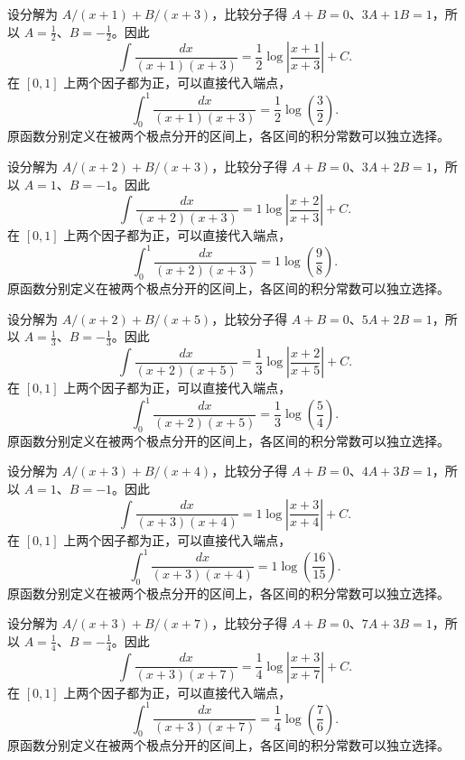 \documentclass[12pt,fontset=fandol]{ctexart}
\begin{document}
\begin{solve}\label{ans:c13q14}
设分解为 $A/(x+1)+B/(x+3)$，比较分子得 $A+B=0$、$3A+1B=1$，所以 $A=\frac{1}{2}$、$B=-\frac{1}{2}$。因此
\[
\int\frac{dx}{(x+1)(x+3)}=\frac{1}{2}\log\left|\frac{x+1}{x+3}\right|+C.
\]
在 $[0,1]$ 上两个因子都为正，可以直接代入端点，
\[
\int_0^1\frac{dx}{(x+1)(x+3)}=\frac{1}{2}\log\left(\frac{3}{2}\right).
\]
原函数分别定义在被两个极点分开的区间上，各区间的积分常数可以独立选择。
\end{solve}

\begin{solve}\label{ans:c13q15}
设分解为 $A/(x+2)+B/(x+3)$，比较分子得 $A+B=0$、$3A+2B=1$，所以 $A=1$、$B=-1$。因此
\[
\int\frac{dx}{(x+2)(x+3)}=1\log\left|\frac{x+2}{x+3}\right|+C.
\]
在 $[0,1]$ 上两个因子都为正，可以直接代入端点，
\[
\int_0^1\frac{dx}{(x+2)(x+3)}=1\log\left(\frac{9}{8}\right).
\]
原函数分别定义在被两个极点分开的区间上，各区间的积分常数可以独立选择。
\end{solve}

\begin{solve}\label{ans:c13q16}
设分解为 $A/(x+2)+B/(x+5)$，比较分子得 $A+B=0$、$5A+2B=1$，所以 $A=\frac{1}{3}$、$B=-\frac{1}{3}$。因此
\[
\int\frac{dx}{(x+2)(x+5)}=\frac{1}{3}\log\left|\frac{x+2}{x+5}\right|+C.
\]
在 $[0,1]$ 上两个因子都为正，可以直接代入端点，
\[
\int_0^1\frac{dx}{(x+2)(x+5)}=\frac{1}{3}\log\left(\frac{5}{4}\right).
\]
原函数分别定义在被两个极点分开的区间上，各区间的积分常数可以独立选择。
\end{solve}

\begin{solve}\label{ans:c13q17}
设分解为 $A/(x+3)+B/(x+4)$，比较分子得 $A+B=0$、$4A+3B=1$，所以 $A=1$、$B=-1$。因此
\[
\int\frac{dx}{(x+3)(x+4)}=1\log\left|\frac{x+3}{x+4}\right|+C.
\]
在 $[0,1]$ 上两个因子都为正，可以直接代入端点，
\[
\int_0^1\frac{dx}{(x+3)(x+4)}=1\log\left(\frac{16}{15}\right).
\]
原函数分别定义在被两个极点分开的区间上，各区间的积分常数可以独立选择。
\end{solve}

\begin{solve}\label{ans:c13q18}
设分解为 $A/(x+3)+B/(x+7)$，比较分子得 $A+B=0$、$7A+3B=1$，所以 $A=\frac{1}{4}$、$B=-\frac{1}{4}$。因此
\[
\int\frac{dx}{(x+3)(x+7)}=\frac{1}{4}\log\left|\frac{x+3}{x+7}\right|+C.
\]
在 $[0,1]$ 上两个因子都为正，可以直接代入端点，
\[
\int_0^1\frac{dx}{(x+3)(x+7)}=\frac{1}{4}\log\left(\frac{7}{6}\right).
\]
原函数分别定义在被两个极点分开的区间上，各区间的积分常数可以独立选择。
\end{solve}
\end{document}
